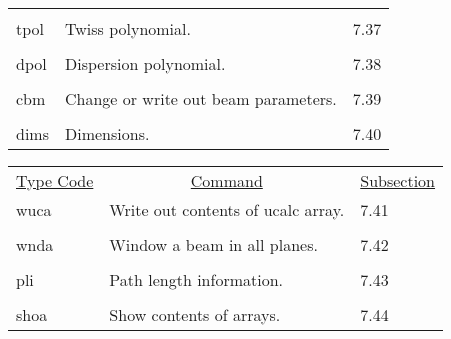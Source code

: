 \begin{center}
\begin{tabular}{lll}
\vspace{-3mm}& &\\
\hspace{1.5em}tpol  &         Twiss polynomial.      & \hspace{2em}7.37\\
\vspace{-3mm}& &\\
\hspace{1.5em}dpol  &         Dispersion polynomial.      & \hspace{2em}7.38\\
\vspace{-3mm}& &\\
\hspace{1.5em}cbm  &    Change or write out beam parameters.      &
\hspace{2em}7.39 \\
\vspace{-3mm}& &\\
\hspace{1.5em}dims  &         Dimensions.      & \hspace{2em}7.40\\
\end{tabular}

\newpage
\begin{tabular}{lll}
\multicolumn{1}{c}{\underline{Type Code}} &
\multicolumn{1}{c}{\underline{Command}}   &
\multicolumn{1}{c}{\underline{Subsection}} \\
\hspace{1.5em}wuca & Write out contents of ucalc array.   & \hspace{2em}7.41 \\
\vspace{-3mm}& & \\
\hspace{1.5em}wnda & Window a beam in all planes.   &  \hspace{2em}7.42 \\
\vspace{-3mm}& & \\
\hspace{1.5em}pli & Path length information. & \hspace{2em}7.43 \\
\vspace{-3mm}& & \\
\hspace{1.5em}shoa & Show contents of arrays. & \hspace{2em}7.44

\end{tabular}
\end{center}

